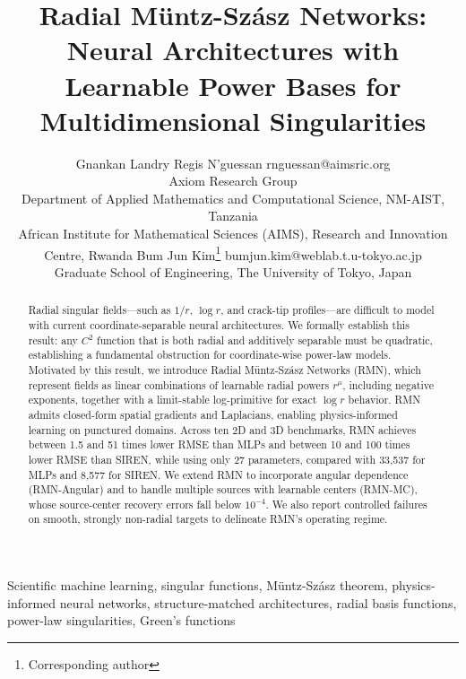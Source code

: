 \documentclass[twoside,11pt]{article}
\begin{document}
\title{Radial M\"untz-Sz\'asz Networks: Neural Architectures with Learnable Power Bases for Multidimensional Singularities}

\author{\name Gnankan Landry Regis N'guessan \email rnguessan@aimsric.org \\
	\addr Axiom Research Group\\
	Department of Applied Mathematics and Computational Science, NM-AIST, Tanzania\\
	African Institute for Mathematical Sciences (AIMS), Research and Innovation Centre, Rwanda
	\AND
	\name Bum Jun Kim\thanks{Corresponding author} \email bumjun.kim@weblab.t.u-tokyo.ac.jp \\
	\addr Graduate School of Engineering, The University of Tokyo, Japan}


\maketitle

\begin{abstract}%
		Radial singular fields---such as $1/r$, $\log r$, and crack-tip profiles---are difficult to model with current coordinate-separable neural architectures. We formally establish this result: any $C^2$ function that is both radial and additively separable must be quadratic, establishing a fundamental obstruction for coordinate-wise power-law models. Motivated by this result, we introduce Radial M\"untz-Sz\'asz Networks (RMN), which represent fields as linear combinations of learnable radial powers $r^\mu$, including negative exponents, together with a limit-stable log-primitive for exact $\log r$ behavior. RMN admits closed-form spatial gradients and Laplacians, enabling physics-informed learning on punctured domains. Across ten 2D and 3D benchmarks, RMN achieves between 1.5 and 51 times lower RMSE than MLPs and between 10 and 100 times lower RMSE than SIREN, while using only 27 parameters, compared with 33,537 for MLPs and 8,577 for SIREN. We extend RMN to incorporate angular dependence (RMN-Angular) and to handle multiple sources with learnable centers (RMN-MC), whose source-center recovery errors fall below $10^{-4}$. We also report controlled failures on smooth, strongly non-radial targets to delineate RMN's operating regime.
\end{abstract}

\begin{keywords}
	Scientific machine learning, singular functions, Müntz-Szász theorem, physics-informed neural networks, structure-matched architectures, radial basis functions, power-law singularities, Green's functions
\end{keywords}
\end{document}
